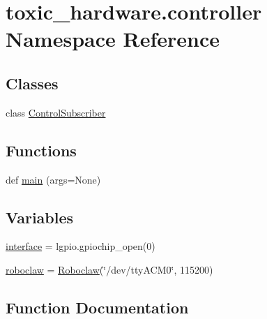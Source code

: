 \hypertarget{namespacetoxic__hardware_1_1controller}{}\section{toxic\+\_\+hardware.\+controller Namespace Reference}
\label{namespacetoxic__hardware_1_1controller}
\subsection*{Classes}
\begin{DoxyCompactItemize}
\item 
class \mbox{\hyperlink{classtoxic__hardware_1_1controller_1_1ControlSubscriber}{Control\+Subscriber}}
\end{DoxyCompactItemize}
\subsection*{Functions}
\begin{DoxyCompactItemize}
\item 
def \mbox{\hyperlink{namespacetoxic__hardware_1_1controller_aac60e1fb14a23592e007ebec1efc50a4}{main}} (args=None)
\end{DoxyCompactItemize}
\subsection*{Variables}
\begin{DoxyCompactItemize}
\item 
\mbox{\hyperlink{namespacetoxic__hardware_1_1controller_ae6deea6e7d03b5d4db98ea209159e57f}{interface}} = lgpio.\+gpiochip\+\_\+open(0)
\item 
\mbox{\hyperlink{namespacetoxic__hardware_1_1controller_a257386444c3afd4030922ffb828f85fe}{roboclaw}} = \mbox{\hyperlink{classtoxic__hardware_1_1roboclaw__3_1_1Roboclaw}{Roboclaw}}(\char`\"{}/dev/tty\+A\+C\+M0\char`\"{}, 115200)
\end{DoxyCompactItemize}


\subsection{Function Documentation}
\mbox{\label{namespacetoxic__hardware_1_1controller_aac60e1fb14a23592e007ebec1efc50a4}} 
